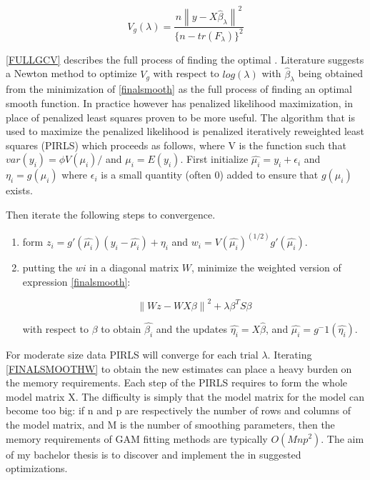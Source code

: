 \documentclass{article}
\begin{document}
    \begin{equation} \label{FULLGCV} V_g(\lambda) = \frac{n\left \| y-X\widehat{\beta}_\lambda \right \| ^2}{\{n-tr(F_\lambda) \}^2} \end{equation}

    \ref{FULLGCV} describes the full process of finding the optimal \textlambda.  Literature suggests a Newton method to optimize $V_g$ with respect to $log(\lambda)$ with $\widehat{\beta}_\lambda$ being obtained from the minimization of \ref{finalsmooth} as the full process of finding an optimal smooth function. In practice however has penalized likelihood maximization, in place of penalized least squares proven to be more useful. The algorithm that is used to maximize the penalized likelihood is penalized iteratively reweighted least squares (PIRLS) which proceeds as follows, where V is the function such that $var(y_i) = \phi V(\mu_i)/$ and $\mu_i = E(y_i)$. First initialize $\widehat{\mu_i} = y_i + \epsilon_i $ and $\eta_i = g(\mu_i)$ where $\epsilon_i$ is a small quantity (often 0) added to ensure that $g(\mu_i)$ exists.

    Then iterate the following steps to convergence.
    \begin{enumerate}
    \item form $z_i = g'(\widehat{\mu_i})(y_i − \widehat{\mu_i}) + \eta_i$ and $w_i = V(\widehat{\mu_i})^(1/2) g'(\widehat{\mu_i})$.
    \item putting the $wi$ in a diagonal matrix $W$, minimize the weighted version of expression \ref{finalsmooth}:

    \begin{equation} \label{FINALSMOOTHW} \left \| Wz - WX\beta  \right \|^2 + \lambda \beta^T S\beta  \end{equation}


    with respect to $\beta$ to obtain $\widehat{\beta_i}$ and the updates $\widehat{\eta_i} =X\widehat{\beta}$, and $\widehat{\mu_i} =g^-1(\widehat{\eta_i})$.
    \end{enumerate}

    For moderate size data PIRLS will converge for each trial $\lambda$. Iterating \ref{FINALSMOOTHW} to obtain the new estimates can place a heavy burden on the memory requirements. Each step of the PIRLS requires to form the whole model matrix X. The difficulty is simply that the model matrix for the model can become too big: if n and p are respectively the number of rows and columns of the model matrix, and M is the number of smoothing parameters, then the memory requirements of GAM fitting methods are typically $O(Mnp^2)$. The aim of my bachelor thesis is to discover and implement the in \cite{bigdataGAM} suggested optimizations.
\end{document}

